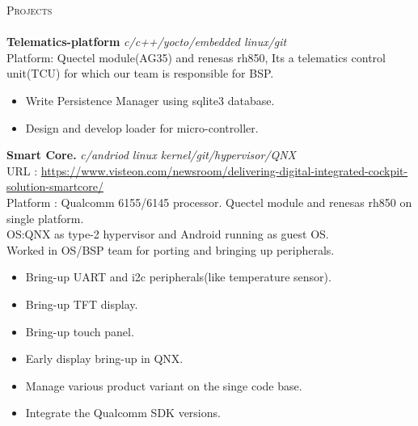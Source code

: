 \documentclass[a4paper]{article}
\newcommand{\lineunder} {
    \vspace*{-8pt} \\
    \hspace*{-18pt} \hrulefill \\
}
\newcommand{\header} [1] {
    {\hspace*{-18pt}\vspace*{6pt} \textsc{#1}}
    \vspace*{-6pt} \lineunder
}
\begin{document}
\header{Projects}
{\textbf{Telematics-platform}} {\sl c/c++/yocto/embedded linux/git} \\
Platform: Quectel module(AG35) and renesas rh850, Its a telematics control unit(TCU) for which our team is responsible for BSP.\\ 
\begin{itemize} \itemsep 0.5pt
\item Write Persistence Manager using sqlite3 database.
\item Design and develop loader for micro-controller.
\end{itemize}
\vspace*{2mm}

{\textbf{Smart Core.}} {\sl c/andriod linux kernel/git/hypervisor/QNX} \\ 
URL : \url{https://www.visteon.com/newsroom/delivering-digital-integrated-cockpit-solution-smartcore/} \\
\vspace*{1mm}
Platform : Qualcomm 6155/6145 processor. Quectel module and renesas rh850 on single platform.\\
OS:QNX as type-2 hypervisor and Android running as guest OS. \\ Worked in OS/BSP team for porting and bringing up peripherals. \\
\begin{itemize} \itemsep 0.5pt
\item Bring-up UART and i2c peripherals(like temperature sensor).
\item Bring-up TFT display. 
\item Bring-up touch panel.
\item Early display bring-up in QNX.
\item Manage various product variant on the singe code base.
\item Integrate the Qualcomm SDK versions.
\end{itemize}
\vspace*{2mm}
\end{document}
